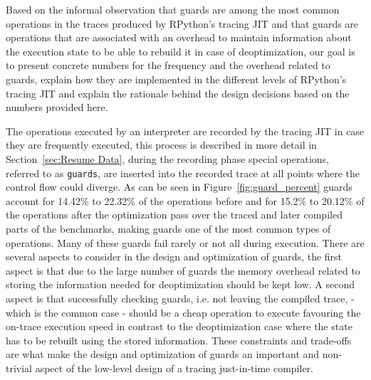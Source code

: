 \documentclass[10pt,preprint]{sigplanconf}
\begin{document}
Based on the informal observation that guards are among the most common
operations in the traces produced by RPython's tracing JIT and that guards are
operations that are associated with an overhead to maintain information about
the execution state to be able to rebuild it in case of deoptimization, our
goal is to present concrete numbers for the frequency and the overhead related
to guards, explain how they are implemented in the different levels of RPython's
tracing JIT and explain the rationale behind the design decisions based on the
numbers provided here.

The operations executed by an interpreter are recorded by the tracing JIT in
case they are frequently executed, this process is described in more detail in
Section~\ref{sec:Resume Data}, during the recording phase special operations,
referred to as \texttt{guards}, are inserted into the recorded trace at all
points where the control flow could diverge. As can be seen in
Figure~\ref{fig:guard_percent} guards account for 14.42\% to 22.32\% of the
operations before and for 15.2\% to 20.12\% of the operations after the
optimization pass over the traced and later compiled parts of the benchmarks,
making guards one of the most common types of operations. Many of these guards
fail rarely or not all during execution. There are several aspects to consider
in the design and optimization of guards, the first aspect is that due to the
large number of guards the memory overhead related to storing the information
needed for deoptimization should be kept low. A second aspect is that
successfully checking guards, i.e. not leaving the compiled trace,  - which is
the common case - should be a cheap operation to execute favouring the on-trace
execution speed in contrast to the deoptimization case where the state has to
be rebuilt using the stored information. These constraints and trade-offs are
what make the design and optimization of guards an important and non-trivial
aspect of the low-level design of a tracing just-in-time compiler.
\end{document}
